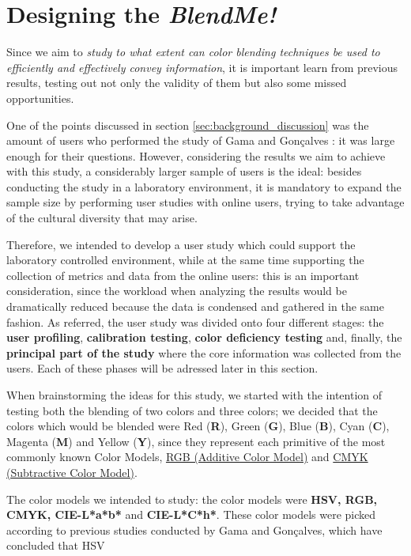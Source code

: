 \section{Designing the \emph{BlendMe!}}
\label{sec:impl_designingsolution}
%
Since we aim to \emph{study to what extent can color blending techniques be used to efficiently and effectively
convey information}, it is important learn from previous results, testing out not only the validity of them but also
some missed opportunities. \par
%
One of the points discussed in section \ref{sec:background_discussion} was the amount of users who performed the study
of Gama and Gonçalves \cite{Gama20141,Gama20142}: it was large enough for their questions. However, considering the
results we aim to achieve with this study, a considerably larger sample of users is the ideal: besides conducting
the study in a laboratory environment, it is mandatory to expand the sample size by performing user studies with
online users, trying to take advantage of the cultural diversity that may arise. \par
%
Therefore, we intended to develop a user study which could support the laboratory controlled environment, while at
the same time supporting the collection of metrics and data from the online users: this is an important consideration,
since the workload when analyzing the results would be dramatically reduced because the data is condensed and gathered
in the same fashion. As referred, the user study was divided onto four different stages: the \textbf{user profiling},
\textbf{calibration testing}, \textbf{color deficiency testing} and, finally, the \textbf{principal part of the study}
where the core information was collected from the users. Each of these phases will be adressed later in this section. \par
%
When brainstorming the ideas for this study, we started with the intention of testing both the blending of two colors and
three colors; we decided that the colors which would be blended were Red (\textbf{R}), Green (\textbf{G}),
Blue (\textbf{B}), Cyan (\textbf{C}), Magenta (\textbf{M}) and Yellow (\textbf{Y}), since they represent each primitive
of the most commonly known Color Models, \ul{RGB (Additive Color Model)} and \ul{CMYK (Subtractive Color Model)}. \par
%
The color models we intended to study: the color models were \textbf{HSV, RGB, CMYK, CIE-L*a*b*} and \textbf{CIE-L*C*h*}.
These color models were picked according to previous studies conducted by Gama and Gonçalves, which have concluded that HSV

